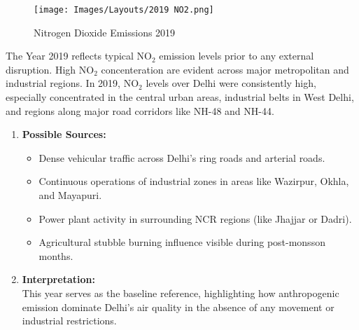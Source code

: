 \documentclass[12pt]{report}
\begin{document}
\begin{figure}[H]
    \centering
    \texttt{[image: Images/Layouts/2019 NO2.png]}
    \caption{Nitrogen Dioxide Emissions 2019}
\end{figure}
The Year 2019 reflects typical NO$_2$ emission levels prior to any external disruption. High NO$_2$ concenteration are evident across major metropolitan and industrial regions.
In 2019, NO$_2$ levels over Delhi were consistently high, especially concentrated in the central urban areas, industrial belts in West Delhi, and regions along major road corridors like NH-48 and NH-44.
\begin{enumerate}
    \item \textbf{Possible Sources:}
    \begin{itemize}
        \item Dense vehicular traffic across Delhi's ring roads and arterial roads.
        \item Continuous operations of industrial zones in areas like Wazirpur, Okhla, and Mayapuri.
        \item Power plant activity in surrounding NCR regions (like Jhajjar or Dadri).
        \item Agricultural stubble burning influence visible during post-monsson months.
    \end{itemize}
    \item \textbf{Interpretation:}\\
    This year serves as the baseline reference, highlighting how anthropogenic emission dominate Delhi's air quality in the absence of any movement or industrial restrictions.
\end{enumerate}
\end{document}

